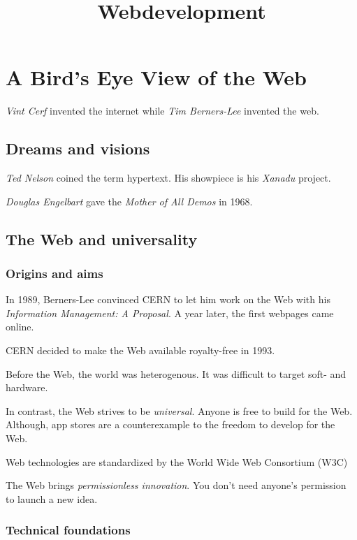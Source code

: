 \documentclass{report}
\title{Webdevelopment}
\date{}
\author{}
\begin{document}
\maketitle

\chapter{A Bird's Eye View of the Web}

\textit{Vint Cerf} invented the internet
while \textit{Tim Berners-Lee} invented the web.

\section{Dreams and visions}

\textit{Ted Nelson} coined the term hypertext.
His showpiece is his \textit{Xanadu} project.

\textit{Douglas Engelbart} gave
the \textit{Mother of All Demos} in 1968.

\section{The Web and universality}

\subsection{Origins and aims}

In 1989, Berners-Lee convinced CERN to let him work
on the Web with his \textit{Information Management: A Proposal}.
A year later, the first webpages came online.

CERN decided to make the Web available royalty-free in 1993.

Before the Web, the world was heterogenous.
It was difficult to target soft- and hardware.

In contrast, the Web strives to be \emph{universal}.
Anyone is free to build for the Web.
Although, app stores are a counterexample
to the freedom to develop for the Web.

Web technologies are standardized
by the World Wide Web Consortium (W3C)

The Web brings \textit{permissionless innovation}.
You don't need anyone's permission to launch a new idea.

\subsection{Technical foundations}
\end{document}

